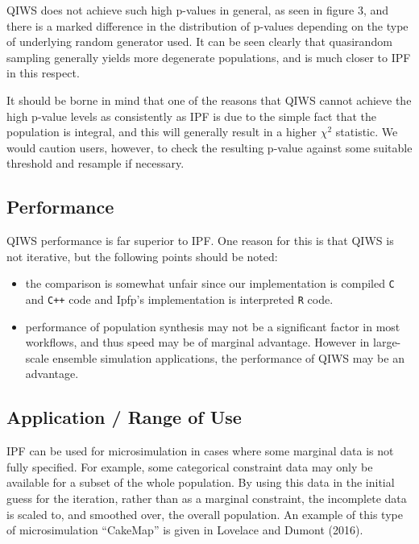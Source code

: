\documentclass[]{article}
\begin{document}
QIWS does not achieve such high p-values in general, as seen in figure
3, and there is a marked difference in the distribution of p-values
depending on the type of underlying random generator used. It can be
seen clearly that quasirandom sampling generally yields more degenerate
populations, and is much closer to IPF in this respect.

It should be borne in mind that one of the reasons that QIWS cannot
achieve the high p-value levels as consistently as IPF is due to the
simple fact that the population is integral, and this will generally
result in a higher \(\chi^2\) statistic. We would caution users,
however, to check the resulting p-value against some suitable threshold
and resample if necessary.

\subsection{Performance}\label{performance-1}

QIWS performance is far superior to IPF. One reason for this is that
QIWS is not iterative, but the following points should be noted:

\begin{itemize}
\item
  the comparison is somewhat unfair since our implementation is compiled
  \texttt{C} and \texttt{C++} code and Ipfp's implementation is
  interpreted \texttt{R} code.
\item
  performance of population synthesis may not be a significant factor in
  most workflows, and thus speed may be of marginal advantage. However
  in large-scale ensemble simulation applications, the performance of
  QIWS may be an advantage.
\end{itemize}

\subsection{Application / Range of Use}\label{application-range-of-use}

IPF can be used for microsimulation in cases where some marginal data is
not fully specified. For example, some categorical constraint data may
only be available for a subset of the whole population. By using this
data in the initial guess for the iteration, rather than as a marginal
constraint, the incomplete data is scaled to, and smoothed over, the
overall population. An example of this type of microsimulation
``CakeMap'' is given in Lovelace and Dumont (2016).
\end{document}
